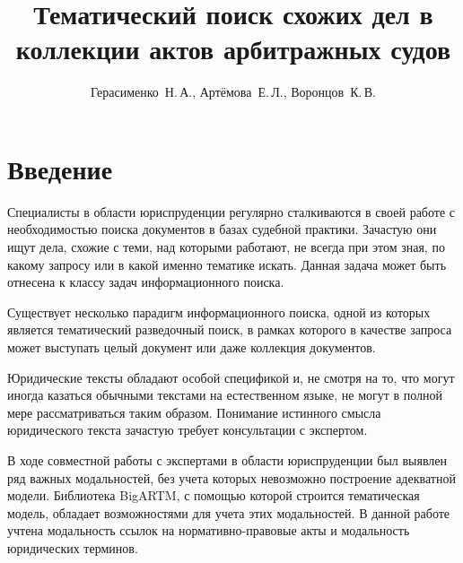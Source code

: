 \documentclass[12pt]{article}
\title
    [Тематический поиск схожих дел в коллекции актов арбитражных судов] %
    {Тематический поиск схожих дел в коллекции актов арбитражных судов}
\author
    [Герасименко~Н.\,А.] %
    {Герасименко~Н.\,А., Артёмова~Е.\,Л., Воронцов~К.\,В.} %
    [Герасименко~Н.\,А.$^1$, Артёмова~Е.\,Л.$^2$, Воронцов~К.\,В.$^3$] %
\begin{document}
\maketitle
\section{Введение}




Специалисты в области юриспруденции регулярно сталкиваются в своей работе с необходимостью поиска документов в базах судебной практики. Зачастую они ищут дела, схожие с теми, над которыми работают, не всегда при этом зная, по какому запросу или в какой именно тематике искать. Данная задача может быть отнесена к классу задач информационного поиска.

Существует несколько парадигм информационного поиска, одной из которых является тематический разведочный поиск, в рамках которого в качестве запроса может выступать целый документ или даже коллекция документов.


Юридические тексты обладают особой спецификой и, не смотря на то, что могут иногда казаться обычными текстами на естественном языке, не могут в полной мере рассматриваться таким образом. Понимание истинного смысла юридического текста зачастую требует консультации с экспертом.

В ходе совместной работы с экспертами в области юриспруденции был выявлен ряд важных модальностей, без учета которых невозможно построение адекватной модели. Библиотека BigARTM\cite{BigARTM2015}, с помощью которой строится тематическая модель, обладает возможностями для учета этих модальностей. В данной работе учтена модальность ссылок на нормативно-правовые акты и модальность юридических терминов.

\end{document}
